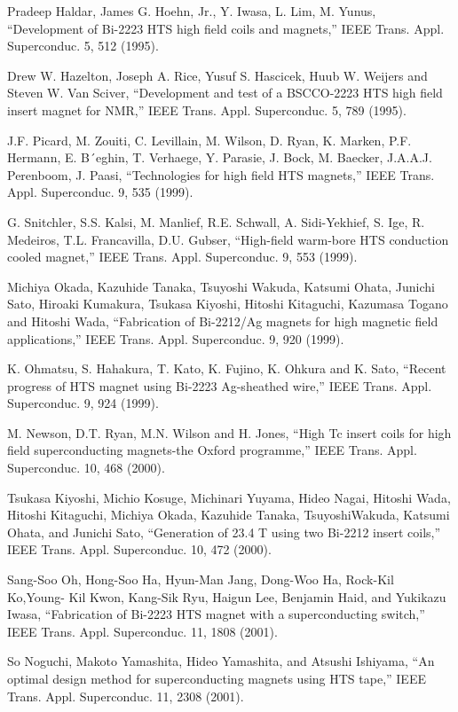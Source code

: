 \noindent [9.345] Pradeep Haldar, James G. Hoehn, Jr., Y. Iwasa, L. Lim, M. Yunus, ``Development
of Bi-2223 HTS high field coils and magnets,” IEEE Trans. Appl. Superconduc.
5, 512 (1995).

\noindent [9.346] Drew W. Hazelton, Joseph A. Rice, Yusuf S. Hascicek, Huub W. Weijers and
Steven W. Van Sciver, ``Development and test of a BSCCO-2223 HTS high field
insert magnet for NMR,” IEEE Trans. Appl. Superconduc. 5, 789 (1995).

\noindent [9.347] J.F. Picard, M. Zouiti, C. Levillain, M. Wilson, D. Ryan, K. Marken, P.F. Hermann,
E. B´eghin, T. Verhaege, Y. Parasie, J. Bock, M. Baecker, J.A.A.J. Perenboom,
J. Paasi, ``Technologies for high field HTS magnets,” IEEE Trans. Appl.
Superconduc. 9, 535 (1999).

\noindent [9.348] G. Snitchler, S.S. Kalsi, M. Manlief, R.E. Schwall, A. Sidi-Yekhief, S. Ige, R. Medeiros,
T.L. Francavilla, D.U. Gubser, ``High-field warm-bore HTS conduction
cooled magnet,” IEEE Trans. Appl. Superconduc. 9, 553 (1999).

\noindent [9.349] Michiya Okada, Kazuhide Tanaka, Tsuyoshi Wakuda, Katsumi Ohata, Junichi
Sato, Hiroaki Kumakura, Tsukasa Kiyoshi, Hitoshi Kitaguchi, Kazumasa Togano
and Hitoshi Wada, ``Fabrication of Bi-2212/Ag magnets for high magnetic field
applications,” IEEE Trans. Appl. Superconduc. 9, 920 (1999).

\noindent [9.350] K. Ohmatsu, S. Hahakura, T. Kato, K. Fujino, K. Ohkura and K. Sato, ``Recent
progress of HTS magnet using Bi-2223 Ag-sheathed wire,” IEEE Trans. Appl.
Superconduc. 9, 924 (1999).

\noindent [9.351] M. Newson, D.T. Ryan, M.N. Wilson and H. Jones, ``High Tc insert coils for
high field superconducting magnets-the Oxford programme,” IEEE Trans. Appl.
Superconduc. 10, 468 (2000).

\noindent [9.352] Tsukasa Kiyoshi, Michio Kosuge, Michinari Yuyama, Hideo Nagai, Hitoshi Wada,
Hitoshi Kitaguchi, Michiya Okada, Kazuhide Tanaka, TsuyoshiWakuda, Katsumi
Ohata, and Junichi Sato, ``Generation of 23.4 T using two Bi-2212 insert coils,”
IEEE Trans. Appl. Superconduc. 10, 472 (2000).

\noindent [9.353] Sang-Soo Oh, Hong-Soo Ha, Hyun-Man Jang, Dong-Woo Ha, Rock-Kil Ko,Young-
Kil Kwon, Kang-Sik Ryu, Haigun Lee, Benjamin Haid, and Yukikazu Iwasa, ``Fabrication
of Bi-2223 HTS magnet with a superconducting switch,” IEEE Trans.
Appl. Superconduc. 11, 1808 (2001).

\noindent [9.354] So Noguchi, Makoto Yamashita, Hideo Yamashita, and Atsushi Ishiyama, ``An
optimal design method for superconducting magnets using HTS tape,” IEEE
Trans. Appl. Superconduc. 11, 2308 (2001).

